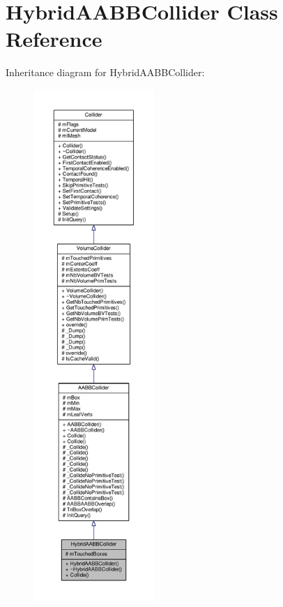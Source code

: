 \hypertarget{classHybridAABBCollider}{}\section{Hybrid\+A\+A\+B\+B\+Collider Class Reference}
\label{classHybridAABBCollider}


Inheritance diagram for Hybrid\+A\+A\+B\+B\+Collider\+:
\nopagebreak
\begin{figure}[H]
\begin{center}
\leavevmode
\includegraphics[height=550pt]{d1/d33/classHybridAABBCollider__inherit__graph}
\end{center}
\end{figure}


